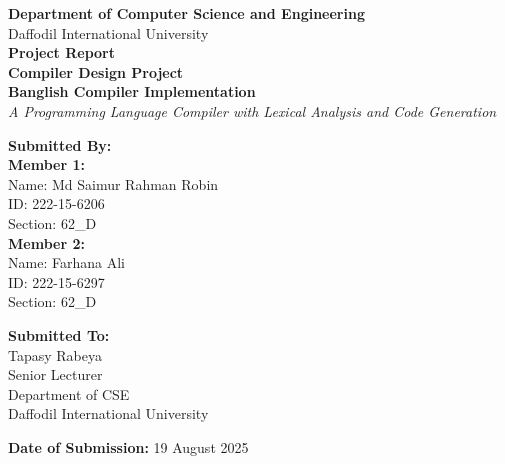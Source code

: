 \documentclass[12pt,a4paper]{article}
\begin{document}
\begin{titlepage}
    \centering
    \vspace*{1cm}
    
    {\Large\textbf{Department of Computer Science and Engineering}}\\[0.5cm]
    {\large Daffodil International University}\\[2cm]
    
    {\huge\bfseries Project Report}\\[0.5cm]
    {\Large\textbf{Compiler Design Project}}\\[1cm]
    
    {\LARGE\color{darkblue}\textbf{Banglish Compiler Implementation}}\\[0.3cm]
    {\large\textit{A Programming Language Compiler with Lexical Analysis and Code Generation}}\\[2cm]
    
    \begin{minipage}{0.45\textwidth}
        \begin{flushleft}
            \textbf{Submitted By:}\\
            \textbf{Member 1:}\\
            Name: Md Saimur Rahman Robin\\
            ID: 222-15-6206\\
            Section: 62\_D\\[0.3cm]
            \textbf{Member 2:}\\
            Name: Farhana Ali\\
            ID: 222-15-6297\\
            Section: 62\_D\\
        \end{flushleft}
    \end{minipage}
    \hfill
    \begin{minipage}{0.45\textwidth}
        \begin{flushright}
            \textbf{Submitted To:}\\
            Tapasy Rabeya\\
            Senior Lecturer\\
            Department of CSE\\
            Daffodil International University\\
        \end{flushright}
    \end{minipage}
    
    \vfill
    
    {\large\textbf{Date of Submission:} 19 August 2025}
    
\end{titlepage}
\end{document}
